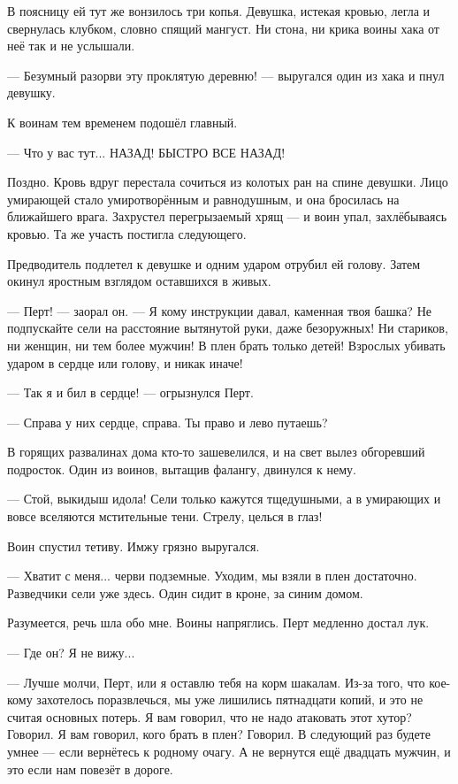 В поясницу ей тут же вонзилось три копья.
Девушка, истекая кровью, легла и свернулась клубком, словно спящий мангуст.
Ни стона, ни крика воины хака от неё так и не услышали.

--- Безумный разорви эту проклятую деревню! --- выругался один из хака и пнул девушку.

К воинам тем временем подошёл главный.

--- Что у вас тут... НАЗАД!
БЫСТРО ВСЕ НАЗАД!

Поздно.
Кровь вдруг перестала сочиться из колотых ран на спине девушки.
Лицо умирающей стало умиротворённым и равнодушным, и она бросилась на ближайшего врага.
Захрустел перегрызаемый хрящ --- и воин упал, захлёбываясь кровью.
Та же участь постигла следующего.

Предводитель подлетел к девушке и одним ударом отрубил ей голову.
Затем окинул яростным взглядом оставшихся в живых.

--- Перт! --- заорал он.
--- Я кому инструкции давал, каменная твоя башка?
Не подпускайте сели на расстояние вытянутой руки, даже безоружных!
Ни стариков, ни женщин, ни тем более мужчин!
В плен брать только детей!
Взрослых убивать ударом в сердце или голову, и никак иначе!

--- Так я и бил в сердце! --- огрызнулся Перт.

--- Справа у них сердце, справа.
Ты право и лево путаешь?

В горящих развалинах дома кто-то зашевелился, и на свет вылез обгоревший подросток.
Один из воинов, вытащив фалангу, двинулся к нему.

--- Стой, выкидыш идола!
Сели только кажутся тщедушными, а в умирающих и вовсе вселяются мстительные тени.
Стрелу, целься в глаз!

Воин спустил тетиву.
Имжу грязно выругался.

--- Хватит с меня... черви подземные.
Уходим, мы взяли в плен достаточно.
Разведчики сели уже здесь.
Один сидит в кроне, за синим домом.

Разумеется, речь шла обо мне.
Воины напряглись.
Перт медленно достал лук.

--- Где он?
Я не вижу...

--- Лучше молчи, Перт, или я оставлю тебя на корм шакалам.
Из-за того, что кое-кому захотелось поразвлечься, мы уже лишились пятнадцати копий, и это не считая основных потерь.
Я вам говорил, что не надо атаковать этот хутор?
Говорил.
Я вам говорил, кого брать в плен?
Говорил.
В следующий раз будете умнее --- если вернётесь к родному очагу.
А не вернутся ещё двадцать мужчин, и это если нам повезёт в дороге.

